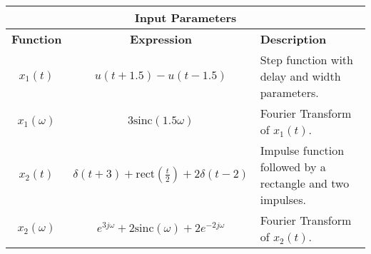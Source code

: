 \documentclass{article}
\begin{document}
\begin{table}[htbp]
    \centering
    \begin{tabular}{|c|c|p{6cm}|}
        \hline
        \multicolumn{3}{|c|}{\textbf{Input Parameters}} \\
        \hline
        \textbf{Function} & \textbf{Expression} & \textbf{Description} \\
        \hline
        $x_1(t)$ & $u(t + 1.5) - u(t - 1.5)$ & Step function with delay and width parameters. \\
        $x_1(\omega)$ & $3\text{sinc}(1.5\omega)$ & Fourier Transform of $x_1(t)$. \\
        $x_2(t)$ & $\delta(t + 3) + \text{rect}\left(\frac{t}{2}\right) + 2\delta(t - 2)$ & Impulse function followed by a rectangle and two impulses. \\
        $x_2(\omega)$ & $e^{3j\omega} + 2\text{sinc}(\omega) + 2e^{-2j\omega}$ & Fourier Transform of $x_2(t)$. \\
        \hline
    \end{tabular}
\end{table}
\end{document}
